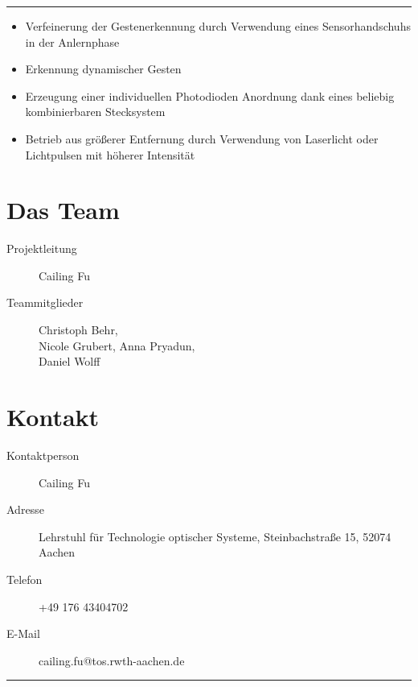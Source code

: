 \documentclass[a4paper,12pt,notumble]{leaflet}
\begin{document}
\textcolor{rwth-lblue}{\noindent\rule{\textwidth}{4pt}}

\noindent
\begin{minipage}[c][0.32\textheight][t]{\textwidth}
	\begin{itemize}
		\item Verfeinerung der Gestenerkennung durch Verwendung eines Sensorhandschuhs in der Anlernphase
		\item Erkennung dynamischer Gesten
		\item Erzeugung einer individuellen Photodioden Anordnung dank eines beliebig kombinierbaren Stecksystem
		\item Betrieb aus größerer Entfernung durch Verwendung von Laserlicht oder Lichtpulsen mit höherer Intensität
	\end{itemize}
\end{minipage}

\newpage



\noindent
\begin{minipage}[c][0.58\textheight][t]{\textwidth}
	\section{Das Team}
	\begin{description}
		\item[Projektleitung] Cailing Fu
		\item[Teammitglieder] Christoph Behr, \\ Nicole Grubert, Anna Pryadun, \\ Daniel Wolff
	\end{description}

	\section{Kontakt}
	\begin{description}
		\item[Kontaktperson] Cailing Fu 
		\item[Adresse] Lehrstuhl für Technologie optischer Systeme, Steinbachstraße 15, 52074 Aachen
		\item[Telefon] +49 176 43404702
		\item[E-Mail] cailing.fu@tos.rwth-aachen.de
	\end{description}
\end{minipage}

\textcolor{rwth-lblue}{\noindent\rule{\textwidth}{4pt}}
\end{document}
